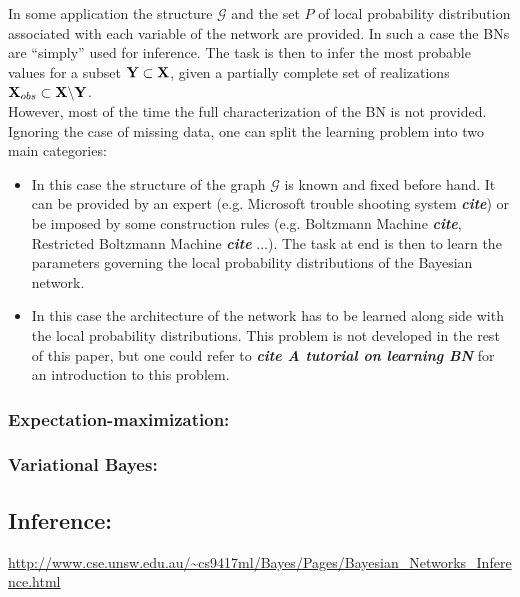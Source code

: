 \documentclass[a4paper,11pt]{report}
\begin{document}
{      In some application the structure $\mathcal{G}$ and the set $P$ of local probability distribution associated with each variable of the network are provided. In such a case the BNs are ``simply'' used for inference. The task is then to infer the most probable values for a subset ${\bf Y} \subset {\bf X}$, given a partially complete set of realizations ${\bf X}_{obs} \subset {\bf X} \backslash {\bf Y}$.\\
      
      However, most of the time the full characterization of the BN is not provided. Ignoring the case of missing data, one can split the learning problem into two main categories:
      \begin{itemize}
				\item {} In this case the structure of the graph $\mathcal{G}$ is known and fixed before hand. It can be provided by an expert (e.g. Microsoft trouble shooting system \textbf{\textit{cite}}) or be imposed by some construction rules (e.g. Boltzmann Machine \textbf{\textit{cite}}, Restricted Boltzmann Machine \textbf{\textit{cite}} ...). The task at end is then to learn the parameters governing the local probability distributions of the Bayesian network.
        \item {} In this case the architecture of the network has to be learned along side with the local probability distributions. This problem is not developed in the rest of this paper, but one could refer to \textbf{\textit{cite A tutorial on learning BN}} for an introduction to this problem.
      \end{itemize}
      
      \subsubsection{Expectation-maximization:}
      
      \subsubsection{Variational Bayes:}

    \subsection{Inference:}
      \label{subseq:PGMs/BN/Inference}
      \url{http://www.cse.unsw.edu.au/~cs9417ml/Bayes/Pages/Bayesian_Networks_Inference.html}
      
}
\end{document}
